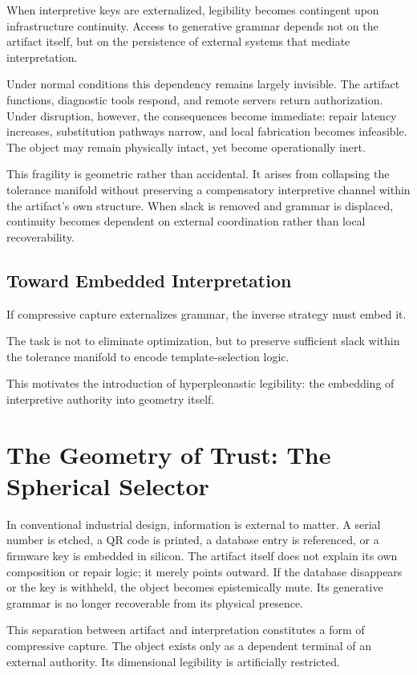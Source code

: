 \documentclass[11pt]{article}
\begin{document}
When interpretive keys are externalized, legibility becomes contingent
upon infrastructure continuity. Access to generative grammar depends not
on the artifact itself, but on the persistence of external systems that
mediate interpretation.

Under normal conditions this dependency remains largely invisible. The
artifact functions, diagnostic tools respond, and remote servers return
authorization. Under disruption, however, the consequences become
immediate: repair latency increases, substitution pathways narrow, and
local fabrication becomes infeasible. The object may remain physically
intact, yet become operationally inert.

This fragility is geometric rather than accidental. It arises from
collapsing the tolerance manifold without preserving a compensatory
interpretive channel within the artifact’s own structure. When slack is
removed and grammar is displaced, continuity becomes dependent on
external coordination rather than local recoverability.

\subsection{Toward Embedded Interpretation}

If compressive capture externalizes grammar,
the inverse strategy must embed it.

The task is not to eliminate optimization,
but to preserve sufficient slack within
the tolerance manifold to encode template-selection logic.

This motivates the introduction of
hyperpleonastic legibility:
the embedding of interpretive authority into geometry itself.

\section{The Geometry of Trust: The Spherical Selector}

In conventional industrial design, information is external to matter. 
A serial number is etched, a QR code is printed, a database entry is 
referenced, or a firmware key is embedded in silicon. The artifact 
itself does not explain its own composition or repair logic; it merely 
points outward. If the database disappears or the key is withheld, the 
object becomes epistemically mute. Its generative grammar is no longer 
recoverable from its physical presence.

This separation between artifact and interpretation constitutes a form 
of compressive capture. The object exists only as a dependent terminal 
of an external authority. Its dimensional legibility is artificially 
restricted.
\end{document}
